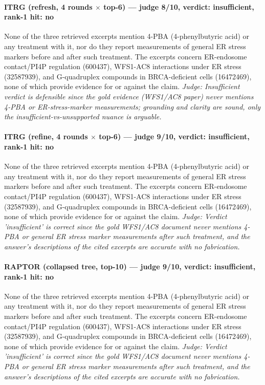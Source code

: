 \documentclass[sigconf, review, anonymous]{acmart}
\begin{document}
\paragraph{ITRG (refresh, 4 rounds $\times$ top-6) --- judge 8/10, verdict: insufficient, rank-1 hit: no}
\noindent None of the three retrieved excerpts mention 4-PBA (4-phenylbutyric acid) or any treatment with it, nor do they report measurements of general ER stress markers before and after such treatment. The excerpts concern ER-endosome contact/PI4P regulation (600437), WFS1-AC8 interactions under ER stress (32587939), and G-quadruplex compounds in BRCA-deficient cells (16472469), none of which provide evidence for or against the claim.
\noindent\small\textit{Judge: Insufficient verdict is defensible since the gold evidence (WFS1/AC8 paper) never mentions 4-PBA or ER-stress-marker measurements; grounding and clarity are sound, only the insufficient-vs-unsupported nuance is arguable.}
\paragraph{ITRG (refine, 4 rounds $\times$ top-6) --- judge 9/10, verdict: insufficient, rank-1 hit: no}
\noindent None of the three retrieved excerpts mention 4-PBA (4-phenylbutyric acid) or any treatment with it, nor do they report measurements of general ER stress markers before and after such treatment. The excerpts concern ER-endosome contact/PI4P regulation (600437), WFS1-AC8 interactions under ER stress (32587939), and G-quadruplex compounds in BRCA-deficient cells (16472469), none of which provide evidence for or against the claim.
\noindent\small\textit{Judge: Verdict 'insufficient' is correct since the gold WFS1/AC8 document never mentions 4-PBA or general ER stress marker measurements after such treatment, and the answer's descriptions of the cited excerpts are accurate with no fabrication.}
\paragraph{RAPTOR (collapsed tree, top-10) --- judge 9/10, verdict: insufficient, rank-1 hit: no}
\noindent None of the three retrieved excerpts mention 4-PBA (4-phenylbutyric acid) or any treatment with it, nor do they report measurements of general ER stress markers before and after such treatment. The excerpts concern ER-endosome contact/PI4P regulation (600437), WFS1-AC8 interactions under ER stress (32587939), and G-quadruplex compounds in BRCA-deficient cells (16472469), none of which provide evidence for or against the claim.
\noindent\small\textit{Judge: Verdict 'insufficient' is correct since the gold WFS1/AC8 document never mentions 4-PBA or general ER stress marker measurements after such treatment, and the answer's descriptions of the cited excerpts are accurate with no fabrication.}
\end{document}
